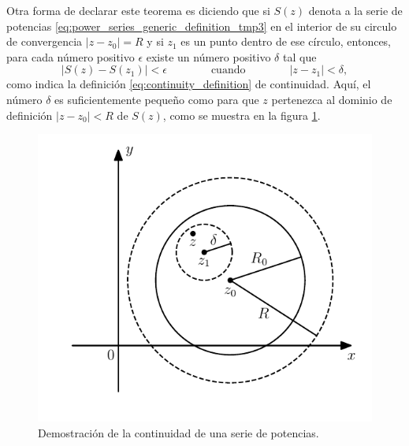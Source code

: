 \documentclass[a4paper]{report}
\begin{document}
Otra forma de declarar este teorema es diciendo que si \(S(z)\) denota a la serie de potencias \ref{eq:power_series_generic_definition_tmp3} en el interior de su circulo de convergencia \(|z-z_0|=R\) y si \(z_1\) es un punto dentro de ese círculo, entonces, para cada número positivo \(\epsilon\) existe un número positivo \(\delta\) tal que 
\begin{equation}\label{eq:series_continuity_proof_tmp4}
 |S(z)-S(z_1)|<\epsilon
 \qquad\qquad\textrm{cuando}\qquad\qquad
 |z-z_1|<\delta, 
\end{equation}
como indica la definición \ref{eq:continuity_definition} de continuidad. Aquí, el número \(\delta\) es suficientemente pequeño como para que \(z\) pertenezca al dominio de definición \(|z-z_0|<R\) de \(S(z)\), como se muestra en la figura \ref{fig:series_continuity}.
\begin{figure}[!htb]
  \begin{minipage}[c]{0.5\textwidth}
    \includegraphics[width=\textwidth]{figuras/series_continuity.pdf}
  \end{minipage}\hfill
  \begin{minipage}[c]{0.4\textwidth}
    \caption{
        Demostración de la continuidad de una serie de potencias.
    }\label{fig:series_continuity}
  \end{minipage}
\end{figure} 
\end{document}
